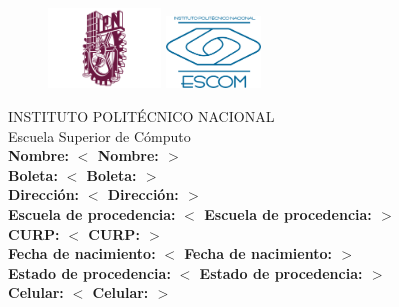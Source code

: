 \documentclass{article}
\newcommand{\placeholder}[1]{\textbf{$<$ #1 $>$}}
\newcommand{\nombre}{\placeholder{Nombre: }}
\newcommand{\boleta}{\placeholder{Boleta: }}
\newcommand{\direccion}{\placeholder{Dirección: }}
\newcommand{\escproc}{\placeholder{Escuela de procedencia: }}
\newcommand{\curp}{\placeholder{CURP: }}
\newcommand{\fechaNacimiento}{\placeholder{Fecha de nacimiento: }}
\newcommand{\estadoProc}{\placeholder{Estado de procedencia: }}
\newcommand{\celular}{\placeholder{Celular: }}
\begin{document}
    \begin{titlepage}
        \begin{center}
            \vspace*{-1in}
            \begin{figure}[htb]
                \centering
                \includegraphics[width= 3cm]{./ipn.png}\hspace{9 cm}
                \includegraphics[width= 2.5cm]{./escom.png}
            \end{figure}
        \end{center}
        \begin{center}
            \LARGE{INSTITUTO POLITÉCNICO NACIONAL}\\
            \Large{Escuela Superior de Cómputo}\\
            \vspace*{5 cm}
            \textbf{Nombre: }\nombre{} \\
            \textbf{Boleta: }\boleta{} \\
            \textbf{Dirección: }\direccion{}\\
            \textbf{Escuela de procedencia: }\escproc{}\\
            \textbf{CURP: } \curp{} \\
            \textbf{Fecha de nacimiento: } \fechaNacimiento{} \\
            \textbf{Estado de procedencia: } \estadoProc{}\\
            \textbf{Celular: }\celular{}
        \end{center}
    \end{titlepage}
\end{document}
